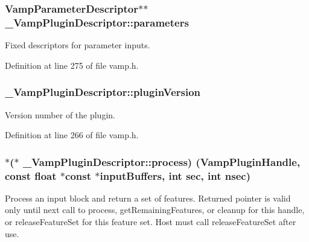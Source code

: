 \subsubsection[{\texorpdfstring{parameters}{parameters}}]{ {\bf Vamp\+Parameter\+Descriptor}$\ast$$\ast$ \+\_\+\+Vamp\+Plugin\+Descriptor\+::parameters}\hypertarget{struct___vamp_plugin_descriptor_a64d614862604c31d6b84c49005f51913}{}\label{struct___vamp_plugin_descriptor_a64d614862604c31d6b84c49005f51913}
Fixed descriptors for parameter inputs. 

Definition at line 275 of file vamp.\+h.

\subsubsection[{\texorpdfstring{plugin\+Version}{pluginVersion}}]{ \+\_\+\+Vamp\+Plugin\+Descriptor\+::plugin\+Version}\hypertarget{struct___vamp_plugin_descriptor_a04427c420d9252c7796c0bf5101345ae}{}\label{struct___vamp_plugin_descriptor_a04427c420d9252c7796c0bf5101345ae}
Version number of the plugin. 

Definition at line 266 of file vamp.\+h.

\subsubsection[{\texorpdfstring{process}{process}}]{$\ast$($\ast$ \+\_\+\+Vamp\+Plugin\+Descriptor\+::process) ({\bf Vamp\+Plugin\+Handle}, {\bf const} float $\ast${\bf const} $\ast$input\+Buffers, {\bf int} sec, {\bf int} nsec)}\hypertarget{struct___vamp_plugin_descriptor_aff1c25291c967cb2f198b900e551a7eb}{}\label{struct___vamp_plugin_descriptor_aff1c25291c967cb2f198b900e551a7eb}
Process an input block and return a set of features. Returned pointer is valid only until next call to process, get\+Remaining\+Features, or cleanup for this handle, or release\+Feature\+Set for this feature set. Host must call release\+Feature\+Set after use. 

